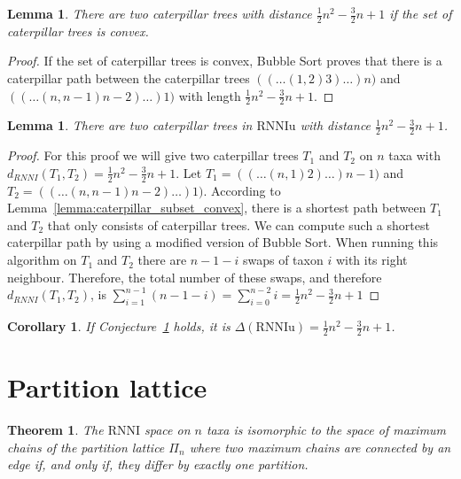 \documentclass[11pt, a4paper]{article}
\newcommand{\rnni}{\mathrm{RNNI}}
\newcommand{\rnniu}{\mathrm{RNNIu}}
\newtheorem{theorem}[definition]{Theorem}
\newtheorem{lemma}[definition]{Lemma}
\newtheorem{corollary}[definition]{Corollary}
\begin{document}
\begin{lemma}
	There are two caterpillar trees with distance $\frac{1}{2}n^2-\frac{3}{2}n+1$ if the set of caterpillar trees is convex.
	\label{lemma:caterpillar_diameter_convex}
\end{lemma}

\begin{proof}
	If the set of caterpillar trees is convex, Bubble Sort proves that there is a caterpillar path between the caterpillar trees
	$(( \dots (1,2)3)\dots)n)$ and $(( \dots (n,n-1)n-2)\dots)1)$ with length $\frac{1}{2}n^2-\frac{3}{2}n+1$.
\end{proof}

\begin{lemma}
	There are two caterpillar trees in $\rnniu$ with distance $\frac{1}{2}n^2-\frac{3}{2}n+1$.
	\label{conj:caterpillar_diameter}
\end{lemma}

\begin{proof}
    For this proof we will give two caterpillar trees $T_1$ and $T_2$ on $n$ taxa with $d_{RNNI}(T_1,T_2) = \frac{1}{2}n^2-\frac{3}{2}n+1$.
	Let $T_1 = (( \dots (n,1)2)\dots)n-1)$ and $T_2 = (( \dots (n,n-1)n-2)\dots)1)$.
    According to Lemma~\ref{lemma:caterpillar_subset_convex}, there is a shortest path between $T_1$ and $T_2$ that only consists of caterpillar trees.
    We can compute such a shortest caterpillar path by using a modified version of Bubble Sort.
    When running this algorithm on $T_1$ and $T_2$ there are $n-1-i$ swaps of taxon $i$ with its right neighbour.
    Therefore, the total number of these swaps, and therefore $d_{RNNI}(T_1,T_2)$, is $\sum\limits_{i=1}^{n-1}(n-1-i) = \sum\limits_{i=0}^{n-2}i = \frac{1}{2}n^2-\frac{3}{2}n+1$
\end{proof}

\begin{corollary}
	If Conjecture~\ref{conj:caterpillar_diameter} holds, it is $\Delta(\rnniu) = \frac{1}{2}n^2-\frac{3}{2}n+1$.
\end{corollary}

\section{Partition lattice}


\begin{theorem}
	The $\rnni$ space on $n$ taxa is isomorphic to the space of maximum chains of the partition lattice $\Pi_n$ where two maximum chains are connected by an edge if, and only if, they differ by exactly one partition.
\end{theorem}



\end{document}

